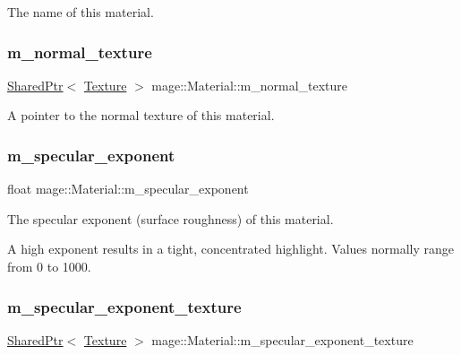 The name of this material. \hypertarget{structmage_1_1_material_a18e56785d5ca3ae5a9b99c64e70622d6}{}\label{structmage_1_1_material_a18e56785d5ca3ae5a9b99c64e70622d6} 
\subsubsection{\texorpdfstring{m\+\_\+normal\+\_\+texture}{m\_normal\_texture}}
{\footnotesize\ttfamily \hyperlink{namespacemage_a1e01ae66713838a7a67d30e44c67703e}{Shared\+Ptr}$<$ \hyperlink{classmage_1_1_texture}{Texture} $>$ mage\+::\+Material\+::m\+\_\+normal\+\_\+texture\hspace{0.3cm}{\ttfamily [private]}}

A pointer to the normal texture of this material. \hypertarget{structmage_1_1_material_a62a9e8d9f90bf569b9f692c28da6a7dc}{}\label{structmage_1_1_material_a62a9e8d9f90bf569b9f692c28da6a7dc} 
\subsubsection{\texorpdfstring{m\+\_\+specular\+\_\+exponent}{m\_specular\_exponent}}
{\footnotesize\ttfamily float mage\+::\+Material\+::m\+\_\+specular\+\_\+exponent\hspace{0.3cm}{\ttfamily [private]}}

The specular exponent (surface roughness) of this material.

A high exponent results in a tight, concentrated highlight. Values normally range from 0 to 1000. \hypertarget{structmage_1_1_material_a452a92691f612bd21857525c00c5e8e5}{}\label{structmage_1_1_material_a452a92691f612bd21857525c00c5e8e5} 
\subsubsection{\texorpdfstring{m\+\_\+specular\+\_\+exponent\+\_\+texture}{m\_specular\_exponent\_texture}}
{\footnotesize\ttfamily \hyperlink{namespacemage_a1e01ae66713838a7a67d30e44c67703e}{Shared\+Ptr}$<$ \hyperlink{classmage_1_1_texture}{Texture} $>$ mage\+::\+Material\+::m\+\_\+specular\+\_\+exponent\+\_\+texture\hspace{0.3cm}{\ttfamily [private]}}

